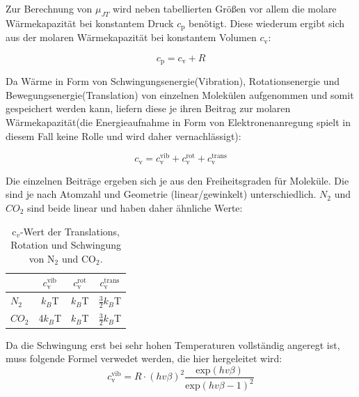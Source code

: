 \documentclass[a4paper,12pt,oneside,onecolum,final,openany]{report}
\begin{document}
Zur Berechnung von $\mu_{JT}$ wird neben tabellierten Größen vor allem die molare Wärmekapazität bei konstantem Druck $c_\mathrm{p}$ benötigt. Diese wiederum ergibt sich aus der molaren Wärmekapazität bei konstantem Volumen $c_\mathrm{v}$:

\begin{equation}
c_\mathrm{p} = c_\mathrm{v} +R
\end{equation}

Da Wärme in Form von Schwingungsenergie(Vibration), Rotationsenergie und Bewegungsenergie(Translation) von einzelnen Molekülen aufgenommen und somit gespeichert werden kann, liefern diese je ihren Beitrag zur molaren Wärmekapazität(die Energieaufnahme in Form von Elektronenanregung spielt in diesem Fall keine Rolle und wird daher vernachlässigt):

\begin{equation}
c_\mathrm{v} = c_\mathrm{v}^\mathrm{ vib} + c_\mathrm{v}^\mathrm{ rot} + c_\mathrm{v}^\mathrm{trans}  
\end{equation}

Die einzelnen Beiträge ergeben sich je aus den Freiheitsgraden für Moleküle. Die sind je nach Atomzahl und Geometrie (linear/gewinkelt) unterschiedlich. $N_2$ und $CO_2$ sind beide linear und haben daher ähnliche Werte:\\


\begin{table} [h]
\centering
\caption{$\text{c}_v$-Wert der Translations, Rotation und Schwingung von $\text{N}_2$ und $\text{CO}_2$.}
\begin{tabular} {l | c|  c | c}
	 & $c_\mathrm{v}^\mathrm{ vib}$  & $c_\mathrm{v}^\mathrm{ rot}$ & $c_\mathrm{v}^\mathrm{trans}$\\
	 \hline
	 $N_2$ & $k_B$T & $k_B$T &$\frac{3}{2}k_B$T\\
	  $CO_2$ & 4$k_B$T & $k_B$T &$\frac{3}{2}k_B$T\\
\end{tabular}
\end{table}

Da die Schwingung erst bei sehr hohen Temperaturen vollständig angeregt ist, muss folgende Formel verwedet werden, die hier hergeleitet wird: \\


\begin{equation}
c_\mathrm{v}^\mathrm{ vib} = R\cdot(hv\beta)^2 \frac{\mathrm{exp}(hv\beta)}{\mathrm{exp}(hv\beta -1)^2}
\end{equation}
\end{document}
